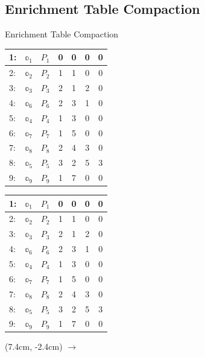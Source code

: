 \documentclass[aspectratio=1610,table]{beamer}
\begin{document}
\subsection{Enrichment Table Compaction}

\begin{frame}{Enrichment Table Compaction}

\begin{multicols}{2}
\begin{center}
\begin{tabular}{lc|c|c|c|c|c}
  \rowcolor{green!50!black}
  1: & $\mathbb{o}_1$ & $P_1$ & 0 & 0 & 0 & 0\\ \hline
  \rowcolor{orange}
  2: & $\mathbb{o}_2$ & $P_2$ & 1 & 1 & 0 & 0\\ \hline
  \rowcolor{orange}
  3: & $\mathbb{o}_3$ & $P_3$ & 2 & 1 & 2 & 0\\ \hline
  \rowcolor{orange}
  4: & $\mathbb{o}_6$ & $P_6$ & 2 & 3 & 1 & 0\\ \hline
  \rowcolor{orange}
  5: & $\mathbb{o}_4$ & $P_4$ & 1 & 3 & 0 & 0\\ \hline
  \rowcolor{darkred!70}
  6: & $\mathbb{o}_7$ & $P_7$ & 1 & 5 & 0 & 0\\ \hline
  \rowcolor{orange}
  7: & $\mathbb{o}_8$ & $P_8$ & 2 & 4 & 3 & 0\\ \hline
  \rowcolor{darkred!70}
  8: & $\mathbb{o}_5$ & $P_5$ & 3 & 2 & 5 & 3\\ \hline
  \rowcolor{darkred!70}
  9: & $\mathbb{o}_9$ & $P_9$ & 1 & 7 & 0 & 0
\end{tabular} 
\end{center}
\begin{center}
\begin{tabular}{lc|c|c|c|c|c}
  \rowcolor{green!50!black}
  1: & $\mathbb{o}_1$ & $P_1$ & 0 & 0 & 0 & 0\\ \hline
  \rowcolor{orange}
  2: & $\mathbb{o}_2$ & $P_2$ & 1 & 1 & 0 & 0\\ \hline
  \rowcolor{orange}
  3: & $\mathbb{o}_3$ & $P_3$ & 2 & 1 & 2 & 0\\ \hline
  \rowcolor{black!60}
  4: & $\mathbb{o}_6$ & $P_6$ & 2 & 3 & 1 & 0\\ \hline
  \rowcolor{orange}
  5: & $\mathbb{o}_4$ & $P_4$ & 1 & 3 & 0 & 0\\ \hline
  \rowcolor{black!60}
  6: & $\mathbb{o}_7$ & $P_7$ & 1 & 5 & 0 & 0\\ \hline
  \rowcolor{black!60}
  7: & $\mathbb{o}_8$ & $P_8$ & 2 & 4 & 3 & 0\\  \hline
  \rowcolor{darkred!70}
  8: & $\mathbb{o}_5$ & $P_5$ & 3 & 2 & 5 & 3\\ \hline
  \rowcolor{black!60}
  9: & $\mathbb{o}_9$ & $P_9$ & 1 & 7 & 0 & 0 
\end{tabular}  
\end{center}
\end{multicols}
\begin{textblock*}{3cm}(7.4cm, -2.4cm) %
$\to$
\end{textblock*}
\end{frame}
\end{document}
